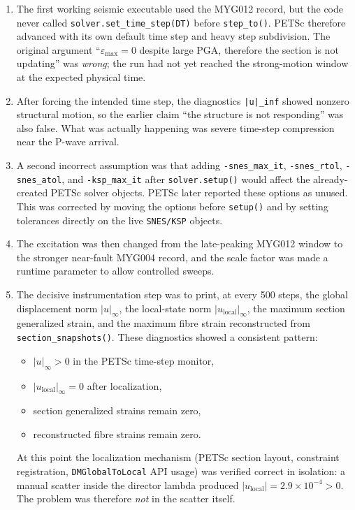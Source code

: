 \begin{enumerate}
  \item The first working seismic executable used the MYG012 record, but the
    code never called \texttt{solver.set\_time\_step(DT)} before
    \texttt{step\_to()}.  PETSc therefore advanced with its own default
    time step and heavy step subdivision.  The original argument
    ``$\varepsilon_{\max}=0$ despite large PGA, therefore the section is
    not updating'' was \emph{wrong}; the run had not yet reached the
    strong-motion window at the expected physical time.
  \item After forcing the intended time step, the diagnostics
    \texttt{|u|\_inf} showed nonzero structural motion, so the earlier
    claim ``the structure is not responding'' was also false.
    What was actually happening was severe time-step compression near the
    P-wave arrival.
  \item A second incorrect assumption was that adding
    \texttt{-snes\_max\_it}, \texttt{-snes\_rtol}, \texttt{-snes\_atol},
    and \texttt{-ksp\_max\_it} after \texttt{solver.setup()} would affect
    the already-created PETSc solver objects.  PETSc later reported these
    options as unused.  This was corrected by moving the options before
    \texttt{setup()} and by setting tolerances directly on the live
    \texttt{SNES/KSP} objects.
  \item The excitation was then changed from the late-peaking MYG012 window
    to the stronger near-fault MYG004 record, and the scale factor was
    made a runtime parameter to allow controlled sweeps.
  \item The decisive instrumentation step was to print, at every 500 steps,
    the global displacement norm $|u|_\infty$, the local-state norm
    $|u_\text{local}|_\infty$, the maximum section generalized strain, and
    the maximum fibre strain reconstructed from \texttt{section\_snapshots()}.
    These diagnostics showed a consistent pattern:
    \begin{itemize}
      \item $|u|_\infty > 0$ in the PETSc time-step monitor,
      \item $|u_\text{local}|_\infty = 0$ after localization,
      \item section generalized strains remain zero,
      \item reconstructed fibre strains remain zero.
    \end{itemize}
    At this point the localization mechanism (PETSc section layout,
    constraint registration, \texttt{DMGlobalToLocal} API usage) was
    verified correct in isolation: a manual scatter inside the director
    lambda produced $|u_\text{local}| = 2.9\times10^{-4} > 0$.
    The problem was therefore \emph{not} in the scatter itself.


\end{enumerate}
